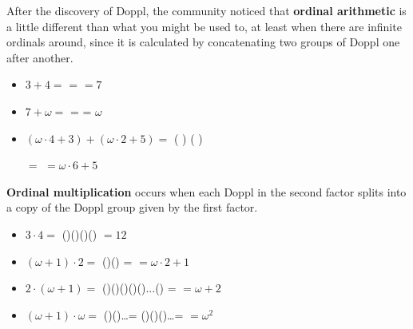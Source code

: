 \newpage

After the discovery of Doppl, the \mappMobimon{} community noticed that
\textbf{ordinal arithmetic} is a little different than what you might be used
to, at least when there are infinite ordinals around, since it is calculated
by concatenating two groups of Doppl one after another.

\begin{itemize}
\item \(3+4=\) \mappDoppl\mappDoppl\mappDoppl{}
\mappDoppl\mappDoppl\mappDoppl\mappDoppl{} =
\mappDoppl\mappDoppl\mappDoppl\mappDoppl\mappDoppl\mappDoppl\mappDoppl{}
\(=7\)

\item \(7+\omega=\)
\mappDoppl\mappDoppl\mappDoppl\mappDoppl\mappDoppl\mappDoppl\mappDoppl{}
\mappDopplOmega{} =
\mappDopplOmega{} =
\(\omega\)

\item \((\omega\cdot4+3)+(\omega\cdot2+5)=\)
(\mappDopplOmega\mappDopplOmega\mappDopplOmega\mappDopplOmega\mappDoppl
\mappDoppl\mappDoppl)
(\mappDopplOmega\mappDopplOmega\mappDoppl\mappDoppl\mappDoppl\mappDoppl
\mappDoppl)

\hspace{1.6in} \(=\)
\mappDopplOmega\mappDopplOmega\mappDopplOmega\mappDopplOmega\mappDopplOmega
\mappDopplOmega\mappDoppl\mappDoppl\mappDoppl\mappDoppl\mappDoppl{}
\(=\omega\cdot6+5\)
\end{itemize}

\textbf{Ordinal multiplication} occurs when each Doppl in the second
factor splits into a copy of the Doppl group given by the first factor.

\begin{itemize}
\item \(3\cdot 4=\)
(\mappDoppl\mappDoppl\mappDoppl)(\mappDoppl\mappDoppl\mappDoppl)(\mappDoppl\mappDoppl\mappDoppl)(\mappDoppl\mappDoppl\mappDoppl) \(=12\)

\item \((\omega+1)\cdot 2=\)
(\mappDopplOmega\mappDoppl)(\mappDopplOmega\mappDoppl) =
\mappDopplOmega\mappDopplOmega\mappDoppl{} \(=\omega\cdot 2+1\)

\item \(2\cdot(\omega+1)=\)
(\mappDoppl\mappDoppl)(\mappDoppl\mappDoppl)(\mappDoppl\mappDoppl)(\mappDoppl\mappDoppl)(\mappDoppl\mappDoppl)...(\mappDoppl\mappDoppl) =
\mappDopplOmega\mappDoppl\mappDoppl \(=\omega+2\)

\item \((\omega+1)\cdot \omega=\)
(\mappDopplOmega\mappDoppl)(\mappDopplOmega\mappDoppl)\dots =
(\mappDopplOmega)(\mappDoppl\mappDopplOmega)(\mappDoppl\mappDopplOmega)\dots =
\mappDopplOmegaSquared \(=\omega^2\)
\end{itemize}

